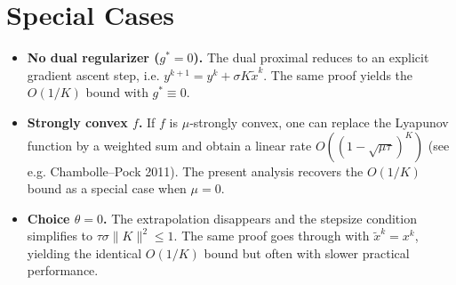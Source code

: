 \documentclass{article}
\begin{document}
\section*{Special Cases}
\begin{itemize}
    \item \textbf{No dual regularizer ($g^{*}=0$).} The dual proximal reduces to an explicit gradient ascent step, i.e. $y^{k+1}=y^{k}+\sigma K\tilde{x}^{k}$. The same proof yields the $O(1/K)$ bound with $g^{*}\equiv0$.
    \item \textbf{Strongly convex $f$.} If $f$ is $\mu$‑strongly convex, one can replace the Lyapunov function by a weighted sum and obtain a linear rate $O((1-\sqrt{\mu\tau})^{K})$ (see e.g. Chambolle–Pock 2011). The present analysis recovers the $O(1/K)$ bound as a special case when $\mu=0$.
    \item \textbf{Choice $\theta=0$.} The extrapolation disappears and the stepsize condition simplifies to $\tau\sigma\|K\|^{2}\le1$. The same proof goes through with $\tilde{x}^{k}=x^{k}$, yielding the identical $O(1/K)$ bound but often with slower practical performance.
\end{itemize}
\end{document}

